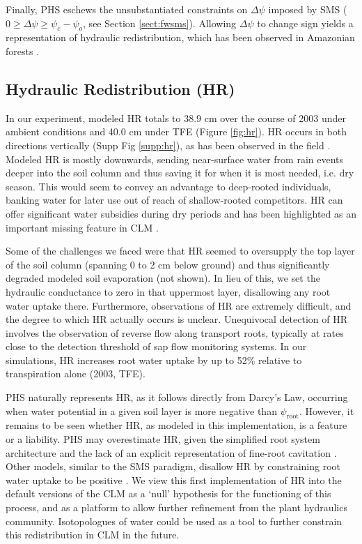 \documentclass[draft,linenumbers]{agujournal}
\begin{document}
     Finally, PHS eschews the unsubstantiated constraints on $\Delta\psi$ imposed by SMS ($0\ge\Delta\psi\ge\psi_c-\psi_o$, see Section \ref{sect:fwsms}).
    Allowing $\Delta\psi$ to change sign yields a representation of hydraulic redistribution, which has been observed in Amazonian forests \citep{oliveira2005}.
    
\subsection{Hydraulic Redistribution (HR)}
    In our experiment, modeled HR totals to 38.9 cm over the course of 2003 under ambient conditions and 40.0 cm under TFE (Figure \ref{fig:hr}).
    HR occurs in both directions vertically (Supp Fig \ref{supp:hr}), as has been observed in the field \citep{burgess1998}.
    Modeled HR is mostly downwards, sending near-surface water from rain events deeper into the soil column and thus saving it for when it is most needed, i.e. dry season.
    This would seem to convey an advantage to deep-rooted individuals, banking water for later use out of reach of shallow-rooted competitors.
    HR can offer significant water subsidies during dry periods \citep{jackson2000} and has been highlighted as an important missing feature in CLM \citep{lee2005}.
    
    Some of the challenges we faced were that HR seemed to oversupply the top layer of the soil column (spanning 0 to 2 cm below ground) and thus significantly degraded modeled soil evaporation (not shown). 
    In lieu of this, we set the hydraulic conductance to zero in that uppermost layer, disallowing any root water uptake there.
    Furthermore, observations of HR are extremely difficult, and the degree to which HR actually occurs is unclear. 
    Unequivocal detection of HR involves the observation of reverse flow along transport roots, typically at rates close to the detection threshold of sap flow monitoring systems. 
    In our simulations, HR increases root water uptake by up to 52\% relative to transpiration alone (2003, TFE). 
    
    PHS naturally represents HR, as it follows directly from Darcy's Law, occurring when water potential in a given soil layer is more negative than $\psi_{\text{root}}$.
    However, it remains to be seen whether HR, as modeled in this implementation, is a feature or a liability.
    PHS may overestimate HR, given the simplified root system architecture \citep{bouda2017} 
    and the lack of an explicit representation of fine-root cavitation \citep{kotowska2015}.
    Other models, similar to the SMS paradigm, disallow HR by constraining root water uptake to be positive \citep{xu2016}.
    We view this first implementation of HR into the default versions of the CLM as a `null' hypothesis for the functioning of this process, and as a platform to allow further refinement from the plant hydraulics community. 
    Isotopologues of water could be used as a tool to further constrain this redistribution in CLM in the future. 
\end{document}
